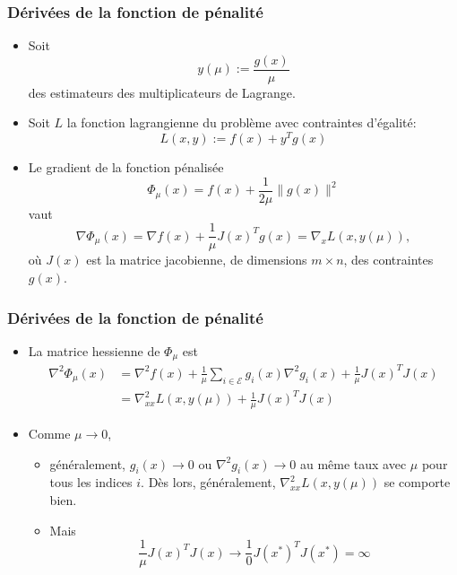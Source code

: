 \documentclass[t,usepdftitle=false,aspectratio=169]{beamer}
\def\cE{\mathcal{E}}
\begin{document}
\begin{frame}
\frametitle{Dérivées de la fonction de pénalité}

\begin{itemize}
\item
Soit
$$
y(\mu) := \frac{g(x)}{\mu}
$$
des estimateurs des multiplicateurs de Lagrange.
\item
Soit $L$ la fonction lagrangienne du problème avec contraintes d'égalité:
$$
L(x,y) := f(x) + y^Tg(x)
$$
\item
Le gradient de la fonction pénalisée
$$
\Phi_{\mu}(x) = f(x) + \frac{1}{2\mu} \| g(x) \|^2
$$
vaut
$$
\nabla \Phi_{\mu}(x) = \nabla f(x) + \frac{1}{\mu} J(x)^T g(x) = \nabla_x L(x, y(\mu)),
$$
où $J(x)$ est la matrice jacobienne, de dimensions $m \times n$, des contraintes $g(x)$.
\end{itemize}

\end{frame}

\begin{frame}
\frametitle{Dérivées de la fonction de pénalité}

\begin{itemize}
\item
La matrice hessienne de $\Phi_{\mu}$ est
\begin{align*}
\nabla^2 \Phi_{\mu}(x)
&= \nabla^2 f(x) + \frac{1}{\mu} \sum_{i \in \cE} g_i(x) \nabla^2 g_i(x) + \frac{1}{\mu} J(x)^TJ(x) \\
&= \nabla^2_{xx} L(x, y(\mu)) + \frac{1}{\mu} J(x)^TJ(x)
\end{align*}
\item
Comme $\mu \rightarrow 0$,
\begin{itemize}
\item
généralement, $g_i(x) \rightarrow 0$ ou $\nabla^2 g_i(x) \rightarrow 0$ au même taux avec $\mu$ pour tous les indices $i$.
Dès lors, généralement, $\nabla^2_{xx} L(x, y(\mu))$ se comporte bien.
\item
Mais
$$
\frac{1}{\mu} J(x)^TJ(x) \rightarrow \frac{1}{0} J(x^*)^TJ(x^*) = \infty
$$
\end{itemize}
\end{itemize}

\end{frame}
\end{document}
